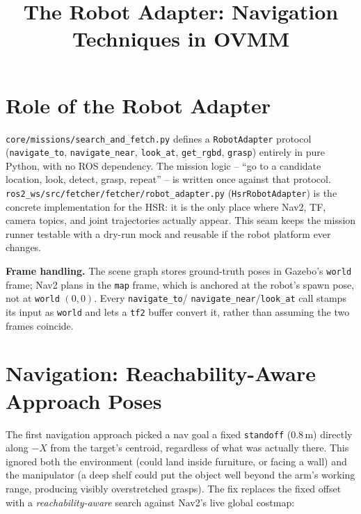 \documentclass[11pt]{article}
\title{The Robot Adapter: Navigation Techniques in OVMM}
\author{}
\date{}
\begin{document}
\sloppy
\maketitle

\section*{Role of the Robot Adapter}

\texttt{core/missions/search\_and\_fetch.py} defines a \texttt{RobotAdapter} protocol
(\texttt{navigate\_to}, \texttt{navigate\_near}, \texttt{look\_at}, \texttt{get\_rgbd},
\texttt{grasp}) entirely in pure Python, with no ROS dependency. The mission logic --
``go to a candidate location, look, detect, grasp, repeat'' -- is written once against
that protocol. \texttt{ros2\_ws/src/fetcher/fetcher/robot\_adapter.py}
(\texttt{HsrRobotAdapter}) is the concrete implementation for the HSR: it is the only
place where Nav2, TF, camera topics, and joint trajectories actually appear. This seam
keeps the mission runner testable with a dry-run mock and reusable if the robot
platform ever changes.

\textbf{Frame handling.} The scene graph stores ground-truth poses in Gazebo's
\texttt{world} frame; Nav2 plans in the \texttt{map} frame, which is anchored at the
robot's spawn pose, not at \texttt{world} $(0,0)$. Every \texttt{navigate\_to}/
\texttt{navigate\_near}/\texttt{look\_at} call stamps its input as \texttt{world} and
lets a \texttt{tf2} buffer convert it, rather than assuming the two frames coincide.

\section*{Navigation: Reachability-Aware Approach Poses}

The first navigation approach picked a nav goal a fixed \texttt{standoff} (0.8\,m)
directly along $-X$ from the target's centroid, regardless of what was actually there.
This ignored both the environment (could land inside furniture, or facing a wall) and
the manipulator (a deep shelf could put the object well beyond the arm's working
range, producing visibly overstretched grasps). The fix replaces the fixed offset with
a \emph{reachability-aware} search against Nav2's live global costmap:
\end{document}
